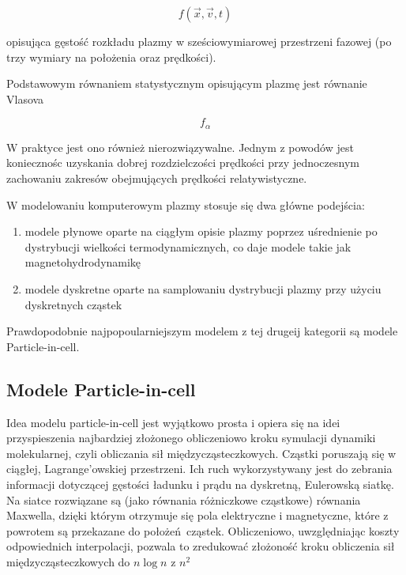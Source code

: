 \begin{equation}
f(\vec{x}, \vec{v}, t)
\end{equation}

opisująca gęstość rozkładu plazmy w sześciowymiarowej przestrzeni fazowej (po trzy wymiary na położenia oraz prędkości).

Podstawowym równaniem statystycznym opisującym plazmę jest równanie Vlasova %

\begin{equation}
f_{\alpha}
\end{equation}

W praktyce jest ono również nierozwiązywalne. Jednym z powodów jest koniecznośc uzyskania dobrej rozdzielczości prędkości
przy jednoczesnym zachowaniu zakresów obejmujących prędkości relatywistyczne. %

W modelowaniu komputerowym plazmy stosuje się dwa główne podejścia:
\begin{enumerate}
\item modele płynowe oparte na ciągłym opisie plazmy poprzez uśrednienie po dystrybucji
wielkości termodynamicznych, co daje modele takie jak magnetohydrodynamikę %
\item modele dyskretne oparte na samplowaniu dystrybucji plazmy przy użyciu dyskretnych cząstek
\end{enumerate}

Prawdopodobnie najpopoularniejszym modelem z tej drugeij kategorii są modele Particle-in-cell.

\subsection{Modele Particle-in-cell}

Idea modelu particle-in-cell jest wyjątkowo prosta i opiera się na idei przyspieszenia najbardziej złożonego obliczeniowo kroku
symulacji dynamiki molekularnej, czyli obliczania sił międzycząsteczkowych. Cząstki poruszają się w ciągłej, Lagrange'owskiej przestrzeni.
Ich ruch wykorzystywany jest do zebrania informacji dotyczącej gęstości ładunku i prądu na dyskretną, Eulerowską siatkę. Na siatce rozwiązane
są (jako równania różniczkowe cząstkowe) równania Maxwella, dzięki którym otrzymuje się pola elektryczne i magnetyczne, które z powrotem są przekazane
do położeń cząstek. Obliczeniowo, uwzględniając koszty odpowiednich interpolacji, pozwala to zredukować złożoność kroku obliczenia sił międzycząsteczkowych
do $n \log{n}$ z $n^2$ %

